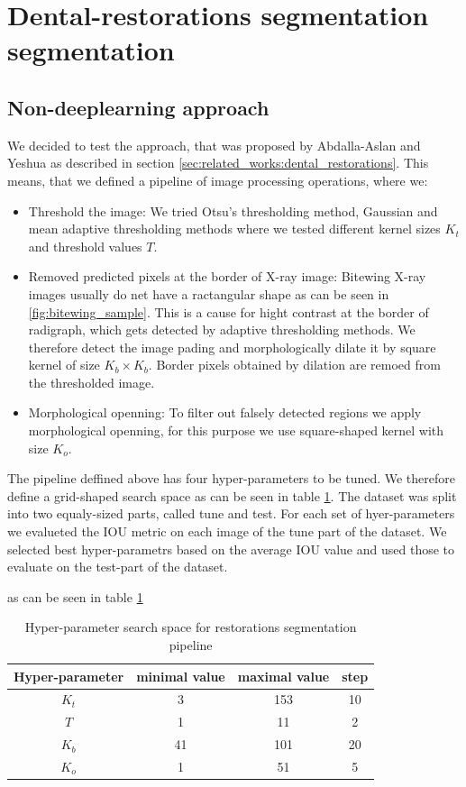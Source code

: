 \section{Dental-restorations segmentation segmentation}
\subsection{Non-deeplearning approach}
We decided to test the approach, that was proposed by Abdalla-Aslan and Yeshua \cite{AbdallaAslan2020,Yeshua2019} as described in section \ref{sec:related_works:dental_restorations}. This means, that we defined a pipeline of image processing operations, where we:
\begin{itemize}
    \item Threshold the image: We tried Otsu's thresholding method, Gaussian and mean adaptive thresholding methods where we tested different kernel sizes $K_t$ and threshold values $T$.
    \item Removed predicted pixels at the border of X-ray image: Bitewing X-ray images usually do net have a ractangular shape as can be seen in \ref{fig:bitewing_sample}. This is a cause for hight contrast at the border of radigraph, which gets detected by adaptive thresholding methods. We therefore detect the image pading and morphologically dilate it by square kernel of size $K_b \times K_b$. Border pixels obtained by dilation are remoed from the thresholded image.
    \item Morphological openning: To filter out falsely detected regions we apply morphological openning, for this purpose we use square-shaped kernel with size $K_o$.
\end{itemize}

The pipeline deffined above has four hyper-parameters to be tuned. We therefore define a grid-shaped search space as can be seen in table \ref{tab:hyper_param_segmentation}. The dataset was split into two equaly-sized parts, called tune and test. For each set of hyer-parameters we evalueted the IOU metric on each image of the tune part of the dataset. We selected best hyper-parametrs based on the average IOU value and used those to evaluate on the test-part of the dataset.

as can be seen in table \ref{tab:hyper_param_segmentation}
\begin{table}
    \begin{tabular}{|c|c|c|c|}
        \hline
        Hyper-parameter & minimal value & maximal value & step \\ \hline
        $K_t$           & 3             & 153           & 10   \\ \hline
        $T$             & 1             & 11            & 2    \\ \hline
        $K_b$           & 41            & 101           & 20   \\ \hline
        $K_o$           & 1             & 51            & 5    \\ \hline
    \end{tabular}
    \caption{Hyper-parameter search space for restorations segmentation pipeline}
    \label{tab:hyper_param_segmentation}
\end{table}

